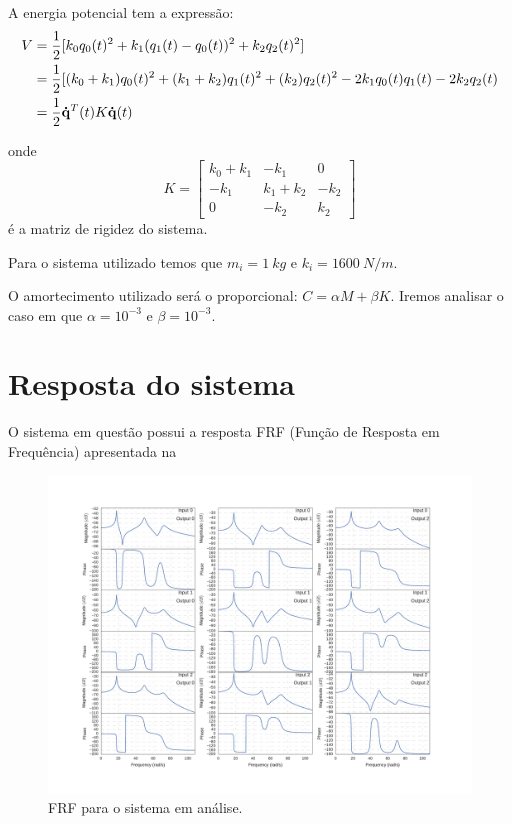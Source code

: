 A energia potencial tem a expressão:
\begin{equation}
\begin{split}
V &= \frac{1}{2}[k_0 q_0(t)^2 + k_1(q_1(t) - q_0(t))^2 + k_2 q_2(t)^2] \\
&= \frac{1}{2}[(k_0+k_1)q_0(t)^2 + (k_1+k_2)q_1(t)^2 + (k_2)q_2(t)^2 -2k_1  q_0(t)q_1(t) - 2k_2 q_2(t) \\
&= \frac{1}{2}{\bf \dot{q}}^T(t) K  {\bf \dot{q}}(t)
\end{split}
\end{equation}

onde
\begin{equation*}
K = 
\begin{bmatrix} 
k_0 +k_1 & -k_1 & 0\\
-k_1 & k_1+k_2 & -k_2 \\
0 & -k_2 & k_2
\end{bmatrix}
\end{equation*}   
é a matriz de rigidez do sistema.

Para o sistema utilizado temos que $m_i = 1 \ kg$ e $k_i = 1600 \ N/m$.

O amortecimento utilizado será o proporcional: $C = \alpha M + \beta K$. Iremos analisar o caso em que $\alpha = 10^{-3}$ e $\beta = 10^{-3}$.

\section{Resposta do sistema}

O sistema em questão possui a resposta  FRF (Função de Resposta em Frequência) apresentada na 

\begin{figure}[!h]
	\centering
	\includegraphics[trim={2.5cm, 2cm, 2.5cm, 2.5cm}, scale=0.6]{IMGS/FRF_all}
	\caption{FRF para o sistema em análise.}
	\label{fig:FRF_all}
\end{figure}

